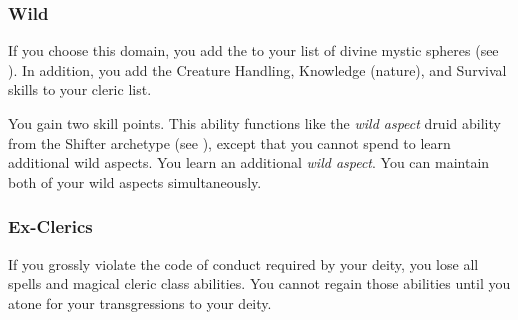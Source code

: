         \subsubsection{Wild}
            If you choose this domain, you add the   to your list of divine mystic spheres (see ).
            In addition, you add the Creature Handling, Knowledge (nature), and Survival skills to your cleric  list.

             You gain two skill points.
             This ability functions like the \textit{wild aspect} druid ability from the Shifter archetype (see ), except that you cannot spend  to learn additional wild aspects.
             You learn an additional \textit{wild aspect}.
             You can maintain both of your wild aspects simultaneously.

        \subsubsection{Ex-Clerics}
            If you grossly violate the code of conduct required by your deity, you lose all spells and magical cleric class abilities.
            You cannot regain those abilities until you atone for your transgressions to your deity.

\newpage
